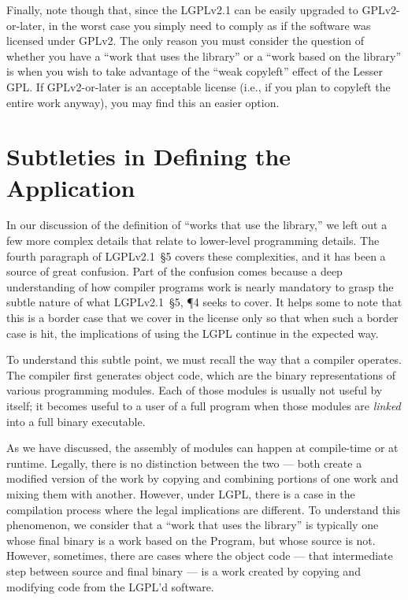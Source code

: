 Finally, note though that, since the LGPLv2.1 can be easily upgraded to
GPLv2-or-later, in the worst case you simply need to comply as if the
software was licensed under GPLv2.  The only reason you must consider the
question of whether you have a ``work that uses the library'' or a ``work
based on the library'' is when you wish to take advantage of the ``weak
copyleft'' effect of the Lesser GPL\@.  If GPLv2-or-later is an acceptable
license (i.e., if you plan to copyleft the entire work anyway), you may find
this an easier option.

\section{Subtleties in Defining the Application}

In our discussion of the definition of ``works that use the library,'' we
left out a few more complex details that relate to lower-level programming
details. The fourth paragraph of LGPLv2.1~\S5 covers these complexities,
and it has been a source of great confusion. Part of the confusion comes
because a deep understanding of how compiler programs work is nearly
mandatory to grasp the subtle nature of what LGPLv2.1~\S5, \P 4 seeks to
cover. It helps some to note that this is a border case that we cover in
the license only so that when such a border case is hit, the implications
of using the LGPL continue in the expected way.

To understand this subtle point, we must recall the way that a compiler
operates. The compiler first generates object code, which are the binary
representations of various programming modules. Each of those modules is
usually not useful by itself; it becomes useful to a user of a full program
when those modules are {\em linked\/} into a full binary executable.

As we have discussed, the assembly of modules can happen at compile-time
or at runtime. Legally, there is no distinction between the two --- both
create a modified version of the work by copying and combining portions of one work and
mixing them with another. However, under LGPL, there is a case in the
compilation process where the legal implications are different.
To understand this phenomenon, we consider that a ``work that uses the
library'' is typically one whose final binary is a work based on the Program,
but whose source is not.  However, sometimes, there
are cases where the object code --- that intermediate step between source
and final binary --- is a work created by copying and modifying code
from the LGPL'd software.

